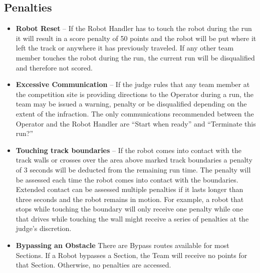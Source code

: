 \subsection{Penalties}
\begin{itemize}
\item \textbf{Robot Reset} – If the Robot Handler has to touch the robot during the run it will result in a score penalty of 50 points and the robot will be put where it left the track or anywhere it has previously traveled. If any other team member touches the robot during the run, the current run will be disqualified and therefore not scored.
\item \textbf{Excessive Communication} – If the judge rules that any team member at the competition site is providing directions to the Operator during a run, the team may be issued a warning, penalty or be disqualified depending on the extent of the infraction. The only communications recommended between the Operator and the Robot Handler are “Start when ready” and “Terminate this run?” 
\item \textbf{Touching track boundaries} – If the robot comes into contact with the track walls or crosses over the area above marked track boundaries a penalty of 3 seconds will be deducted from the remaining run time. The penalty will be assessed each time the robot comes into contact with the boundaries. Extended contact can be assessed multiple penalties if it lasts longer than three seconds and the robot remains in motion. For example, a robot that stops while touching the boundary will only receive one penalty while one that drives while touching the wall might receive a series of penalties at the judge’s discretion.
\item \textbf{Bypassing an Obstacle}
\label{bypass}
There are Bypass routes available for most Sections. If a Robot bypasses a Section, the Team will receive no points for that Section. Otherwise, no penalties are accessed. 
\end{itemize}


